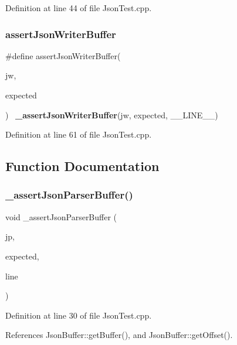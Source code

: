 Definition at line 44 of file Json\+Test.\+cpp.

\mbox{\label{_json_test_8cpp_a576bc9d27a740d45bb60fe2bef06cf97}} 
\subsubsection{assert\+Json\+Writer\+Buffer}
{\footnotesize\ttfamily \#define assert\+Json\+Writer\+Buffer(\begin{DoxyParamCaption}\item[{}]{jw,  }\item[{}]{expected }\end{DoxyParamCaption})~\textbf{ \+\_\+assert\+Json\+Writer\+Buffer}(jw, expected, \+\_\+\+\_\+\+L\+I\+N\+E\+\_\+\+\_\+)}



Definition at line 61 of file Json\+Test.\+cpp.



\subsection{Function Documentation}
\mbox{\label{_json_test_8cpp_ab2f1136e7778215387f4a4a5f13834e4}} 
\subsubsection{\+\_\+assert\+Json\+Parser\+Buffer()}
{\footnotesize\ttfamily void \+\_\+assert\+Json\+Parser\+Buffer (\begin{DoxyParamCaption}\item[{\textbf{ Json\+Parser} \&}]{jp,  }\item[{const char $\ast$}]{expected,  }\item[{size\+\_\+t}]{line }\end{DoxyParamCaption})}



Definition at line 30 of file Json\+Test.\+cpp.



References Json\+Buffer\+::get\+Buffer(), and Json\+Buffer\+::get\+Offset().



